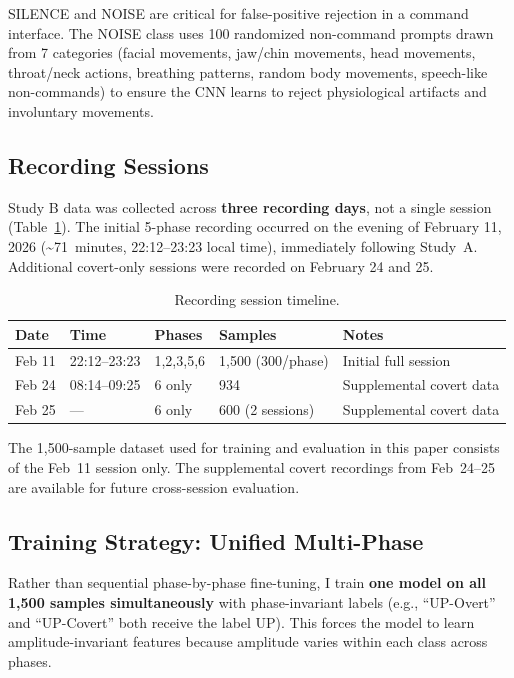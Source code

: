 \documentclass[11pt, a4paper]{article}
\begin{document}
SILENCE and NOISE are critical for false-positive rejection in a command interface. The NOISE class uses 100 randomized non-command prompts drawn from 7 categories (facial movements, jaw/chin movements, head movements, throat/neck actions, breathing patterns, random body movements, speech-like non-commands) to ensure the CNN learns to reject physiological artifacts and involuntary movements.

\subsection{Recording Sessions}

Study B data was collected across \textbf{three recording days}, not a single session (Table~\ref{tab:sessions}). The initial 5-phase recording occurred on the evening of February 11, 2026 (\textasciitilde71~minutes, 22:12--23:23 local time), immediately following Study~A. Additional covert-only sessions were recorded on February 24 and 25.

\begin{table}[h]
\centering
\caption{Recording session timeline.}
\label{tab:sessions}
\begin{tabular}{@{}lllll@{}}
\toprule
Date & Time & Phases & Samples & Notes \\
\midrule
Feb 11 & 22:12--23:23 & 1,2,3,5,6 & 1{,}500 (300/phase) & Initial full session \\
Feb 24 & 08:14--09:25 & 6 only      & 934 & Supplemental covert data \\
Feb 25 & ---          & 6 only      & 600 (2 sessions) & Supplemental covert data \\
\bottomrule
\end{tabular}
\end{table}

The 1{,}500-sample dataset used for training and evaluation in this paper consists of the Feb~11 session only. The supplemental covert recordings from Feb~24--25 are available for future cross-session evaluation.

\subsection{Training Strategy: Unified Multi-Phase}

Rather than sequential phase-by-phase fine-tuning, I train \textbf{one model on all 1{,}500 samples simultaneously} with phase-invariant labels (e.g., ``UP-Overt'' and ``UP-Covert'' both receive the label UP). This forces the model to learn amplitude-invariant features because amplitude varies within each class across phases.
\end{document}
